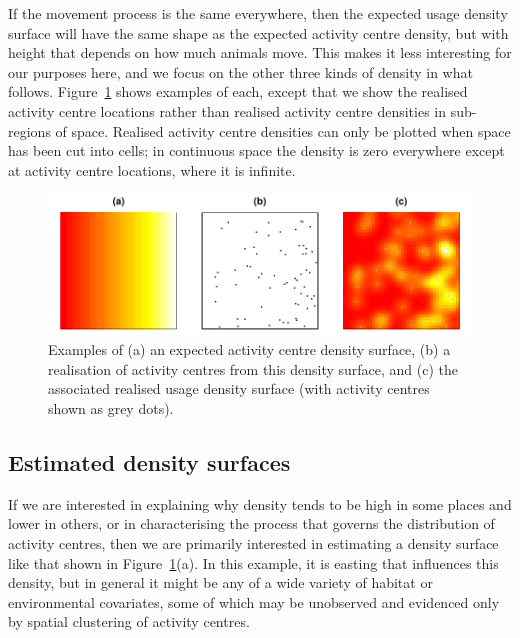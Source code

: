 \documentclass[10pt,a4paper]{article}
\begin{document}
If the movement process is the same everywhere, then the expected usage density surface will have the same shape as the expected activity centre density, but with height that depends on how much animals move.  This makes it less interesting for our purposes here, and we focus on the other three kinds of density in what follows. Figure~\ref{fig:densities} shows examples of each, except that we show the realised activity centre locations rather than realised activity centre densities in sub-regions of space. Realised activity centre densities can only be plotted when space has been cut into cells; in continuous space the density is zero everywhere except at activity centre locations, where it is infinite.

\begin{figure}[htbp]
\centering
\includegraphics[width=\textwidth]{densities.pdf}
\caption{Examples of (a) an expected activity centre density surface, (b) a realisation of activity centres from this density surface, and (c) the associated realised usage density surface (with activity centres shown as grey dots).}
\label{fig:densities}
\end{figure}

\subsection{Estimated density surfaces}

If we are interested in explaining why density tends to be high in some places and lower in others, or in characterising the process that governs the distribution of activity centres, then we are primarily interested in estimating a density surface like that shown in Figure~\ref{fig:densities}(a). In this example, it is easting that influences this density, but in general it might be any of a wide variety of habitat or environmental covariates, some of which may be unobserved and evidenced only by spatial clustering of activity centres. 
\end{document}
